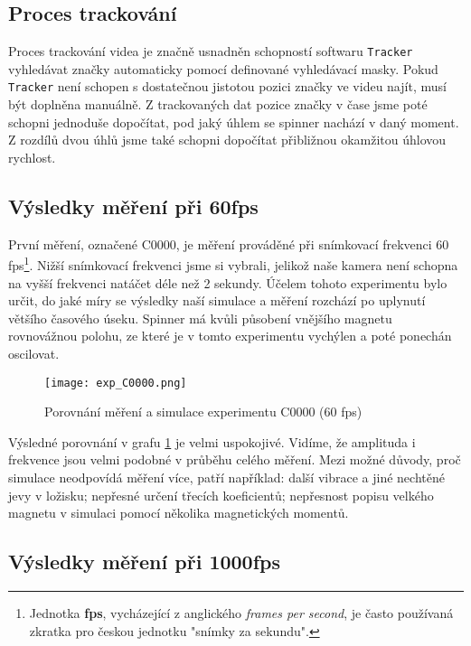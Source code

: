 \subsection{Proces trackování}

Proces trackování videa je značně usnadněn schopností softwaru \texttt{Tracker} vyhledávat značky automaticky pomocí definované vyhledávací masky. Pokud \texttt{Tracker} není schopen s dostatečnou jistotou pozici značky ve videu najít, musí být doplněna manuálně. Z trackovaných dat pozice značky v čase jsme poté schopni jednoduše dopočítat, pod jaký úhlem se spinner nachází v daný moment. Z rozdílů dvou úhlů jsme také schopni dopočítat přibližnou okamžitou úhlovou rychlost.

\subsection{Výsledky měření při 60fps}

První měření, označené C0000, je měření prováděné při snímkovací frekvenci 60 fps\footnote{Jednotka \textbf{fps}, vycházející z anglického \textit{frames per second}, je často používaná zkratka pro českou jednotku "snímky za sekundu".}.
Nižší snímkovací frekvenci jsme si vybrali, jelikož naše kamera není schopna na vyšší frekvenci natáčet déle než 2 sekundy. Účelem tohoto experimentu bylo určit, do jaké míry se výsledky naší simulace a měření rozchází po uplynutí většího časového úseku. Spinner má kvůli působení vnějšího magnetu rovnovážnou polohu, ze které je v tomto experimentu vychýlen a poté ponechán oscilovat.

\begin{figure}[!ht]
    \texttt{[image: exp\_C0000.png]}
    \centering
    \caption{Porovnání měření a simulace experimentu C0000 (60 fps)}
    \label{fig:exp_C0000}
\end{figure}

Výsledné porovnání v grafu \ref{fig:exp_C0000} je velmi uspokojivé. Vidíme, že amplituda i frekvence jsou velmi podobné v průběhu celého měření. Mezi možné důvody, proč simulace neodpovídá měření více, patří například: další vibrace a jiné nechtěné jevy v ložisku; nepřesné určení třecích koeficientů; nepřesnost popisu velkého magnetu v simulaci pomocí několika magnetických momentů.

\clearpage

\subsection{Výsledky měření při 1000fps}

